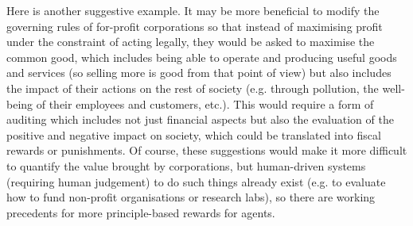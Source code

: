 \documentclass{amsart}
\theoremstyle{indented}
\theoremstyle{indentedProp}
\theoremstyle{indented}
\theoremstyle{indented}
\theoremstyle{indented}
\theoremstyle{indented}
\theoremstyle{indented}
\begin{document}
Here is another suggestive example. It may be more beneficial to modify the governing rules of for-profit corporations so that instead of maximising profit under the constraint of acting legally, they would be asked to maximise the common good, which includes being able to operate and producing useful goods and services (so selling more is good from that point of view) but also includes the impact of their actions on the rest of society (e.g. through pollution, the well-being of their employees and customers, etc.). This would require a form of auditing which includes not just financial aspects but also the evaluation of the positive and negative impact on society, which could be translated into fiscal rewards or punishments. Of course, these suggestions would make it more difficult to quantify the value brought by corporations, but human-driven systems (requiring human judgement) to do such things already exist (e.g. to evaluate how to fund non-profit organisations or research labs), so there are working precedents for more principle-based rewards for agents.

\singlespacing


\end{document}
